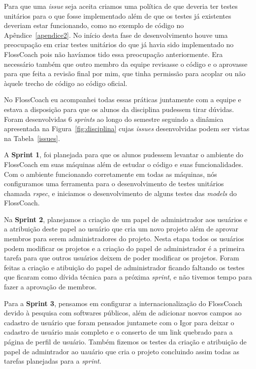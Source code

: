 Para que uma \textit{issue} seja aceita criamos uma política de que deveria ter
testes unitários para o que fosse implementado além de que os testes já existentes
deveriam estar funcionando, como no exemplo de código no Apêndice~\ref{apendice2}.
No início desta fase de desenvolvimento houve uma preocupação 
em criar testes unitários do que já havia sido implementado no FlossCoach pois 
não havíamos tido essa preocupação anteriormente. Era necessário também que outro 
membro da equipe revisasse o código e o aprovasse para que feita a revisão final
por mim, que tinha permissão para acoplar ou não àquele trecho de código ao
código oficial. 

No FlossCoach eu acompanhei todas essas práticas juntamente com a equipe e estava
a disposição para que os alunos da disciplina pudessem tirar dúvidas. Foram desenvolvidas
6 \textit{sprints} ao longo do semestre seguindo a dinâmica apresentada na Figura~\ref{fig:disciplina} 
cujas \textit{issues} desenvolvidas podem ser vistas na Tabela~\ref{issues}.

A \textbf{Sprint 1}, foi planejada para que os alunos pudessem levantar o ambiente
do FlossCoach em suas máquinas além de estudar o código e suas funcionalidades. Com o
ambiente funcionando corretamente em todas as máquinas, nós configuramos uma ferramenta
para o desenvolvimento de testes unitários chamada \textit{rspec}, e iniciamos o 
desenvolvimento de alguns testes das \textit{models} do FlossCoach. 

Na \textbf{Sprint 2}, planejamos a criação de um papel de administrador aos usuários
e a atribuição deste papel ao usuário que cria um novo projeto além de aprovar 
membros para serem administradores do projeto. Nesta etapa todos os usuários podem
modificar os projetos e a criação do papel de administrador é a primeira tarefa 
para que outros usuários deixem de poder modificar os projetos. Foram feitas a 
criação e atibuição do papel de administrador ficando faltando os testes que
ficaram como dívida técnica para a próxima \textit{sprint}, e não tivemos tempo para fazer a 
aprovação de membros. 

Para a \textbf{Sprint 3}, pensamos em configurar a internacionalização do FlossCoach
devido à pesquisa com softwares públicos, além de adicionar nosvos campos ao cadastro 
de usuário que foram pensados juntamete com o Igor para deixar o cadastro de usuário 
mais completo e o conserto de um link quebrado para a página de perfil de usuário.
Também fizemos os testes da criação e atribuição de papel de admintrador ao uauário
que cria o projeto concluindo assim todas as tarefas planejadas para a \textit{sprint}.

